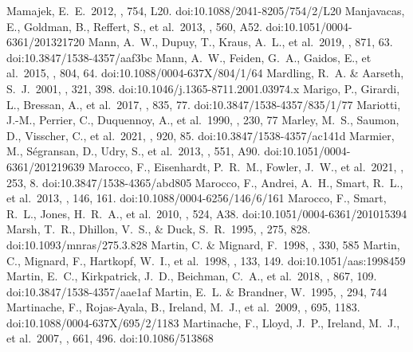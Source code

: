 \documentclass[twocolumn,tighten,twocolappendix]{aastex631}
\begin{document}
\begin{thebibliography}{}
 Mamajek, E.~E.\ 2012, \apjl, 754, L20. doi:10.1088/2041-8205/754/2/L20
 Manjavacas, E., Goldman, B., Reffert, S., et al.\ 2013, \aap, 560, A52. doi:10.1051/0004-6361/201321720
 Mann, A.~W., Dupuy, T., Kraus, A.~L., et al.\ 2019, \apj, 871, 63. doi:10.3847/1538-4357/aaf3bc
 Mann, A.~W., Feiden, G.~A., Gaidos, E., et al.\ 2015, \apj, 804, 64. doi:10.1088/0004-637X/804/1/64
 Mardling, R.~A. \& Aarseth, S.~J.\ 2001, \mnras, 321, 398. doi:10.1046/j.1365-8711.2001.03974.x
 Marigo, P., Girardi, L., Bressan, A., et al.\ 2017, \apj, 835, 77. doi:10.3847/1538-4357/835/1/77
 Mariotti, J.-M., Perrier, C., Duquennoy, A., et al.\ 1990, \aap, 230, 77
 Marley, M.~S., Saumon, D., Visscher, C., et al.\ 2021, \apj, 920, 85. doi:10.3847/1538-4357/ac141d
 Marmier, M., S{\'e}gransan, D., Udry, S., et al.\ 2013, \aap, 551, A90. doi:10.1051/0004-6361/201219639
 Marocco, F., Eisenhardt, P.~R.~M., Fowler, J.~W., et al.\ 2021, \apjs, 253, 8. doi:10.3847/1538-4365/abd805
 Marocco, F., Andrei, A.~H., Smart, R.~L., et al.\ 2013, \aj, 146, 161. doi:10.1088/0004-6256/146/6/161
 Marocco, F., Smart, R.~L., Jones, H.~R.~A., et al.\ 2010, \aap, 524, A38. doi:10.1051/0004-6361/201015394
 Marsh, T.~R., Dhillon, V.~S., \& Duck, S.~R.\ 1995, \mnras, 275, 828. doi:10.1093/mnras/275.3.828
 Martin, C. \& Mignard, F.\ 1998, \aap, 330, 585
 Martin, C., Mignard, F., Hartkopf, W.~I., et al.\ 1998, \aaps, 133, 149. doi:10.1051/aas:1998459
 Martin, E.~C., Kirkpatrick, J.~D., Beichman, C.~A., et al.\ 2018, \apj, 867, 109. doi:10.3847/1538-4357/aae1af
 Martin, E.~L. \& Brandner, W.\ 1995, \aap, 294, 744
 Martinache, F., Rojas-Ayala, B., Ireland, M.~J., et al.\ 2009, \apj, 695, 1183. doi:10.1088/0004-637X/695/2/1183
 Martinache, F., Lloyd, J.~P., Ireland, M.~J., et al.\ 2007, \apj, 661, 496. doi:10.1086/513868

\end{thebibliography}
\end{document}
